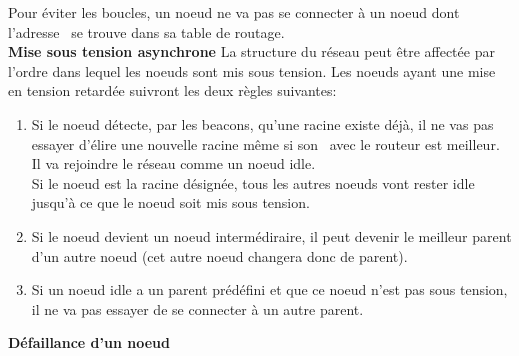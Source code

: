         Pour éviter les boucles, un noeud ne va pas se connecter à un noeud dont l'adresse \mac\ se trouve dans sa table de routage.
        \vspace{0.5cm}\\
        \textbf{Mise sous tension asynchrone}\newline
            La structure du réseau peut être affectée par l'ordre dans lequel les noeuds sont mis sous tension.
            Les noeuds ayant une mise en tension retardée suivront les deux règles suivantes:
            \begin{enumerate}
                \item Si le noeud détecte, par les beacons, qu'une racine existe déjà, il ne vas pas essayer
                    d'élire une nouvelle racine
                    même si son \rssi\ avec le routeur est meilleur. Il va rejoindre le réseau comme un noeud idle. \\
                    Si le noeud est la racine désignée, tous les autres noeuds vont rester idle
                    jusqu'à ce que le noeud soit mis sous tension.
                \item Si le noeud devient un noeud intermédiraire, il peut devenir le meilleur parent d'un autre noeud 
                (cet autre noeud changera donc de parent).
                \item Si un noeud idle a un parent prédéfini et que ce noeud n'est pas sous tension, il ne va pas essayer
                de se connecter à un autre parent.
            \end{enumerate}
        \vspace{0.5cm}
        \textbf{Défaillance d'un noeud}\newline
